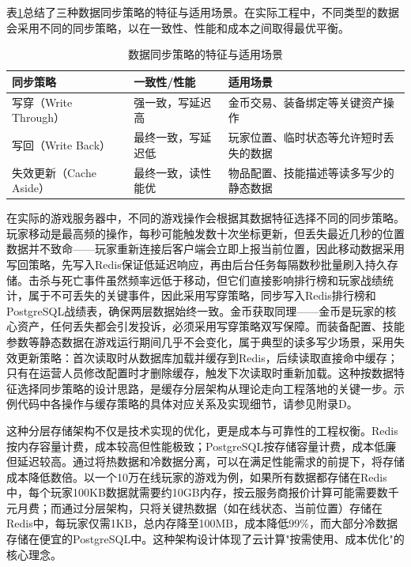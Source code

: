 表\ref{tab:sync-strategy}总结了三种数据同步策略的特征与适用场景。在实际工程中，不同类型的数据会采用不同的同步策略，以在一致性、性能和成本之间取得最优平衡。

\begin{table}[h]
\centering
\caption{数据同步策略的特征与适用场景}
\label{tab:sync-strategy}
\begin{tabular}{p{3.5cm}p{4cm}p{5cm}}
\hline
\textbf{同步策略} & \textbf{一致性/性能} & \textbf{适用场景} \\
\hline
写穿（Write Through） & 强一致，写延迟高 & 金币交易、装备绑定等关键资产操作 \\
写回（Write Back） & 最终一致，写延迟低 & 玩家位置、临时状态等允许短时丢失的数据 \\
失效更新（Cache Aside） & 最终一致，读性能优 & 物品配置、技能描述等读多写少的静态数据 \\
\hline
\end{tabular}
\end{table}

在实际的游戏服务器中，不同的游戏操作会根据其数据特征选择不同的同步策略。玩家移动是最高频的操作，每秒可能触发数十次坐标更新，但丢失最近几秒的位置数据并不致命——玩家重新连接后客户端会立即上报当前位置，因此移动数据采用写回策略，先写入Redis保证低延迟响应，再由后台任务每隔数秒批量刷入持久存储。击杀与死亡事件虽然频率远低于移动，但它们直接影响排行榜和玩家战绩统计，属于不可丢失的关键事件，因此采用写穿策略，同步写入Redis排行榜和PostgreSQL战绩表，确保两层数据始终一致。金币获取同理——金币是玩家的核心资产，任何丢失都会引发投诉，必须采用写穿策略双写保障。而装备配置、技能参数等静态数据在游戏运行期间几乎不会变化，属于典型的读多写少场景，采用失效更新策略：首次读取时从数据库加载并缓存到Redis，后续读取直接命中缓存；只有在运营人员修改配置时才删除缓存，触发下次读取时重新加载。这种按数据特征选择同步策略的设计思路，是缓存分层架构从理论走向工程落地的关键一步。示例代码中各操作与缓存策略的具体对应关系及实现细节，请参见附录D。

这种分层存储架构不仅是技术实现的优化，更是成本与可靠性的工程权衡。Redis按内存容量计费，成本较高但性能极致；PostgreSQL按存储容量计费，成本低廉但延迟较高。通过将热数据和冷数据分离，可以在满足性能需求的前提下，将存储成本降低数倍。以一个10万在线玩家的游戏为例，如果所有数据都存储在Redis中，每个玩家100KB数据就需要约10GB内存，按云服务商报价计算可能需要数千元月费；而通过分层架构，只将关键热数据（如在线状态、当前位置）存储在Redis中，每玩家仅需1KB，总内存降至100MB，成本降低99\%，而大部分冷数据存储在便宜的PostgreSQL中。这种架构设计体现了云计算"按需使用、成本优化"的核心理念。

